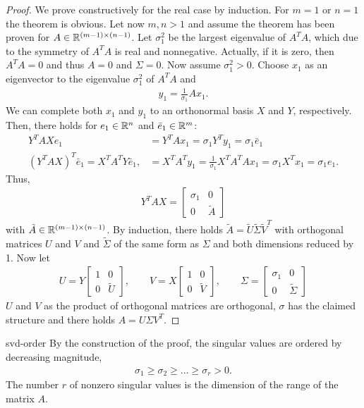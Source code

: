 \begin{proof}
  We prove constructively for the real case by induction. For $m=1$ or
  $n=1$ the theorem is obvious. Let now $m,n>1$ and assume the theorem
  has been proven for $A\in \mathbb R^{(m-1)\times (n-1)}$. Let $\sigma_1^2$
  be the largest eigenvalue of $A^TA$, which due to the symmetry of
  $A^TA$ is real and nonnegative. Actually, if it is zero, then
  $A^TA=0$ and thus $A=0$ and $\Sigma=0$. Now assume $\sigma_1^2 >
  0$. Choose $x_1$ as an eigenvector to the eigenvalue $\sigma_1^2$ of
  $A^TA$ and
  \begin{gather*}
    y_1 = \frac1{\sigma_1} A x_1.
  \end{gather*}
  We can complete both $x_1$ and $y_1$ to an orthonormal basis $X$ and
  $Y$, respectively. Then, there holds for $e_1 \in \mathbb R^n$ and
  $\bar e_1\in \mathbb R^m$:
  \begin{align*}
    Y^TAX e_1 &= Y^T A x_1 = \sigma_1 Y^Ty_1 = \sigma_1 \bar e_1\\
    (Y^TAX)^T \bar e_1 = X^TA^TY\bar e_1,
              &= X^TA^T y_1 =  \tfrac1{\sigma_1} X^TA^TA x_1
                = \sigma_1 X^Tx_1 = \sigma_1 e_1.
  \end{align*}
  Thus,
  \begin{gather*}
    Y^TAX =
    \begin{bmatrix}
      \sigma_1 & 0 \\ 0 & \tilde A
    \end{bmatrix}
  \end{gather*}
  with $\tilde A\in \mathbb R^{(m-1)\times (n-1)}$. By induction, there holds
  $\tilde A = \tilde U \tilde \Sigma \tilde V^T$ with orthogonal
  matrices $U$ and $V$ and $\tilde\Sigma$ of the same form as $\Sigma$
  and both dimensions reduced by 1. Now let
  \begin{gather*}
    U = Y
    \begin{bmatrix}
      1 & 0\\ 0& \tilde U
    \end{bmatrix},
    \qquad
    V = X
    \begin{bmatrix}
      1 & 0 \\ 0& \tilde V
    \end{bmatrix},
    \qquad
    \Sigma =
    \begin{bmatrix}
      \sigma_1 & 0 \\ 0 & \tilde\Sigma
    \end{bmatrix}
  \end{gather*}
  $U$ and $V$ as the product of orthogonal matrices are orthogonal,
  $\sigma$ has the claimed structure and there holds $A=U\Sigma V^T$.
\end{proof}

\begin{Corollary}{svd-order}
  By the construction of the proof, the singular values are ordered by
  decreasing magnitude,
  \begin{gather}
    \label{eq:svd:2}
    \sigma_1 \ge \sigma_2 \ge \dots \ge \sigma_r > 0.
  \end{gather}
  The number $r$ of nonzero singular values is the dimension of the
  range of the matrix $A$.
\end{Corollary}

